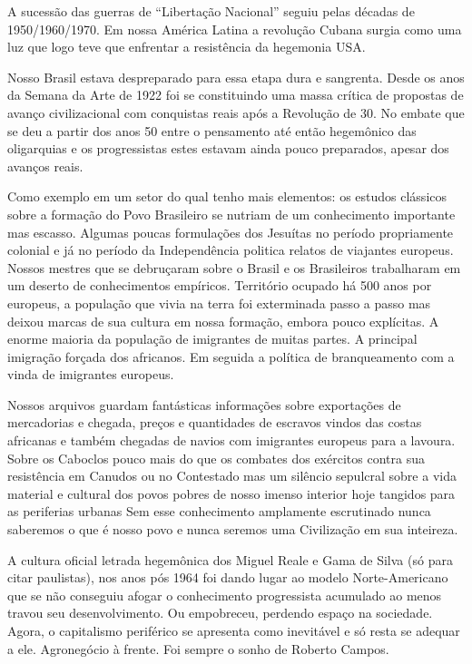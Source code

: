 A sucessão das guerras de “Libertação Nacional” seguiu pelas décadas de
1950/1960/1970. Em nossa América Latina a revolução Cubana surgia como
uma luz que logo teve que enfrentar a resistência da hegemonia USA.

Nosso Brasil estava despreparado para essa etapa dura e sangrenta. Desde
os anos da Semana da Arte de 1922 foi se constituindo uma massa crítica
de propostas de avanço civilizacional com conquistas reais após a
Revolução de 30. No embate que se deu a partir dos anos 50 entre o
pensamento até então hegemônico das oligarquias e os progressistas estes
estavam ainda pouco preparados, apesar dos avanços reais.

Como exemplo em um setor do qual tenho mais elementos: os estudos
clássicos sobre a formação do Povo Brasileiro se nutriam de um
conhecimento importante mas escasso. Algumas poucas formulações dos
Jesuítas no período propriamente colonial e já no período da
Independência politica relatos de viajantes europeus. Nossos mestres que
se debruçaram sobre o Brasil e os Brasileiros trabalharam em um deserto
de conhecimentos empíricos. Território ocupado há 500 anos por europeus,
a população que vivia na terra foi exterminada passo a passo mas deixou
marcas de sua cultura em nossa formação, embora pouco explícitas. A
enorme maioria da população de imigrantes de muitas partes. A principal
imigração forçada dos africanos. Em seguida a política de branqueamento
com a vinda de imigrantes europeus.

Nossos arquivos guardam fantásticas informações sobre exportações de
mercadorias e chegada, preços e quantidades de escravos vindos das
costas africanas e também chegadas de navios com imigrantes europeus
para a lavoura. Sobre os Caboclos pouco mais do que os combates dos
exércitos contra sua resistência em Canudos ou no Contestado mas um
silêncio sepulcral sobre a vida material e cultural dos povos pobres de
nosso imenso interior hoje tangidos para as periferias urbanas Sem esse
conhecimento amplamente escrutinado nunca saberemos o que é nosso povo e
nunca seremos uma Civilização em sua inteireza.

A cultura oficial letrada hegemônica dos Miguel Reale e Gama de Silva
(só para citar paulistas), nos anos pós 1964 foi dando lugar ao modelo
Norte-Americano que se não conseguiu afogar o conhecimento progressista
acumulado ao menos travou seu desenvolvimento. Ou empobreceu, perdendo
espaço na sociedade. Agora, o capitalismo periférico se apresenta como
inevitável e só resta se adequar a ele. Agronegócio à frente. Foi sempre
o sonho de Roberto Campos.

